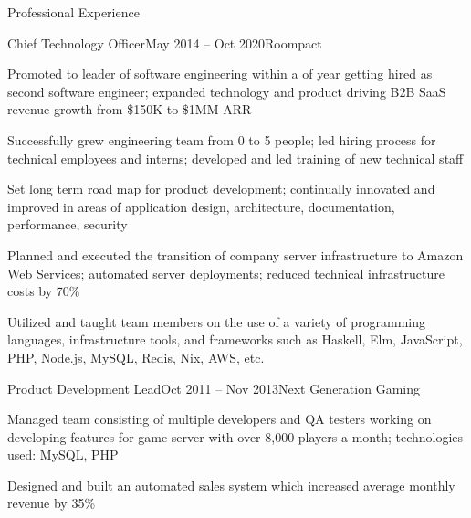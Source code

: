 \documentclass{resume} %
\begin{document}
\begin{rSection}{Professional Experience}
\begin{rSubsection}{Chief Technology Officer}{May 2014 -- Oct 2020}{Roompact}{}
  \item Promoted to leader of software engineering within a of year getting hired as second software engineer; expanded technology and product driving B2B SaaS revenue growth from \$150K to \$1MM ARR
  \item Successfully grew engineering team from 0 to 5 people; led hiring process for technical employees and interns; developed and led training of new technical staff
  \item Set long term road map for product development; continually innovated and improved in areas of application design, architecture, documentation, performance, security
  \item Planned and executed the transition of company server infrastructure to Amazon Web Services; automated server deployments; reduced technical infrastructure costs by 70\%
  \item Utilized and taught team members on the use of a variety of programming languages, infrastructure tools, and frameworks such as Haskell, Elm, JavaScript, PHP, Node.js, MySQL, Redis, Nix, AWS, etc.
\end{rSubsection}


\begin{rSubsection}{Product Development Lead}{Oct 2011 -- Nov 2013}{Next Generation Gaming}{}
  \item Managed team consisting of multiple developers and QA testers working on developing features for game server with over 8,000 players a month; technologies used: MySQL, PHP
  \item Designed and built an automated sales system which increased average monthly revenue by 35\%
\end{rSubsection}

\end{rSection}

\end{document}
